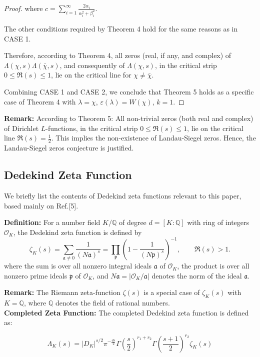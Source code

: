 \documentclass[12pt]{article}
\begin{document}
\begin{proof}
 where $c=\sum_{i=1}^{\infty}\frac{2\alpha_i}{\alpha_i^2+\beta_i^2}$.

 The other conditions required by Theorem 4 hold for the same reasons as in CASE 1.

Therefore, according to Theorem 4, all zeros (real, if any, and complex) of $\Lambda(\chi, s) \Lambda(\bar{\chi}, s)$, and consequently of $\Lambda(\chi, s)$,  in the critical strip $0 \leq \Re(s) \leq 1$, lie on the critical line for $\chi\neq\bar{\chi}$.

 Combining CASE 1 and CASE 2, we conclude that Theorem 5 holds as a specific case of Theorem 4 with $\lambda=\chi$,  $\varepsilon(\lambda)=W(\chi)$, $k=1$.
\end{proof}

\textbf{Remark:} According to Theorem 5: All non-trivial zeros (both real and complex) of Dirichlet $L$-functions, in the critical strip $0\leq \Re(s) \leq 1$, lie on the critical line $\Re(s)=\frac{1}{2}$.  This implies the non-existence of Landau-Siegel zeros. Hence, the Landau-Siegel zeros conjecture is justified.

\subsection{ Dedekind Zeta Function}
We briefly list the contents of Dedekind zeta functions relevant to this paper, based mainly on Ref.[5].

\textbf{Definition:}
For a number field $K/\mathbb{Q}$ of degree
$d=[K:\mathbb{Q}]$ with ring of integers
$\mathcal{O}_K$, the Dedekind zeta function is defined by
\begin{equation}
\zeta_K(s)
=
\sum_{\mathfrak{a}\neq 0}
\frac{1}{(N\mathfrak{a})^s}
=
\prod_{\mathfrak{p}}
\left(1-\frac{1}{(N\mathfrak{p})^s}\right)^{-1},
\qquad \Re(s)>1.
\end{equation}
where the sum is over all nonzero integral ideals
$\mathfrak{a}$ of $\mathcal{O}_K$, the product is over
all nonzero prime ideals $\mathfrak{p}$ of
$\mathcal{O}_K$, and
$N\mathfrak{a}=|\mathcal{O}_K/\mathfrak{a}|$
denotes the norm of the ideal
$\mathfrak{a}$.

\textbf{Remark:} The Riemann zeta-function $\zeta(s)$ is a special case of $\zeta_K(s)$ with $K=\mathbb{Q}$, where $\mathbb{Q}$ denotes the field of rational numbers.\\

\textbf{Completed Zeta Function:}
The completed Dedekind zeta function is defined as:

\begin{equation}\Lambda_K(s) = |D_K|^{s/2} \pi^{-\frac{ds}{2}}\Gamma\left(\frac{s}{2}\right)^{r_1+r_2}
\Gamma\left(\frac{s+1}{2}\right)^{r_2} \zeta_K(s)\end{equation}
\end{document}
